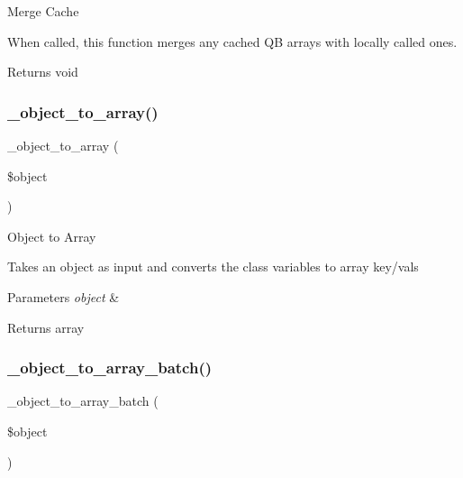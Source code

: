 Merge Cache

When called, this function merges any cached QB arrays with locally called ones.

\begin{DoxyReturn}{Returns}
void 
\end{DoxyReturn}
\mbox{\label{class_c_i___d_b__query__builder_a50b3069661bbf4605b6b561f38eae849}} 
\subsubsection{\texorpdfstring{\+\_\+object\+\_\+to\+\_\+array()}{\_object\_to\_array()}}
{\footnotesize\ttfamily \+\_\+object\+\_\+to\+\_\+array (\begin{DoxyParamCaption}\item[{}]{\$object }\end{DoxyParamCaption})\hspace{0.3cm}{\ttfamily [protected]}}

Object to Array

Takes an object as input and converts the class variables to array key/vals


\begin{DoxyParams}{Parameters}
{\em object} & \\
\hline
\end{DoxyParams}
\begin{DoxyReturn}{Returns}
array 
\end{DoxyReturn}
\mbox{\label{class_c_i___d_b__query__builder_ab53f659c5df0b0b6d30eaab74f507dc5}} 
\subsubsection{\texorpdfstring{\+\_\+object\+\_\+to\+\_\+array\+\_\+batch()}{\_object\_to\_array\_batch()}}
{\footnotesize\ttfamily \+\_\+object\+\_\+to\+\_\+array\+\_\+batch (\begin{DoxyParamCaption}\item[{}]{\$object }\end{DoxyParamCaption})\hspace{0.3cm}{\ttfamily [protected]}}

